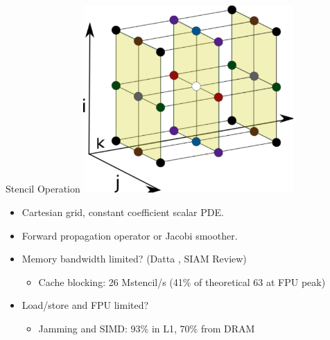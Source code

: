 \begin{frame}{Stencil Operation}
  \centering
  \includegraphics[width=0.6\textwidth]{figures/27_point_colored}
  \begin{itemize}
  \item Cartesian grid, constant coefficient scalar PDE.
  \item Forward propagation operator or Jacobi smoother.
  \item Memory bandwidth limited? (Datta , SIAM Review)
    \begin{itemize}
    \item Cache blocking: 26 Mstencil/s (41\% of theoretical 63 at FPU peak)
    \end{itemize}
  \item Load/store and FPU limited?
    \begin{itemize}
    \item Jamming and SIMD: 93\% in L1, 70\% from DRAM
    \end{itemize}
  \end{itemize}
\end{frame}

